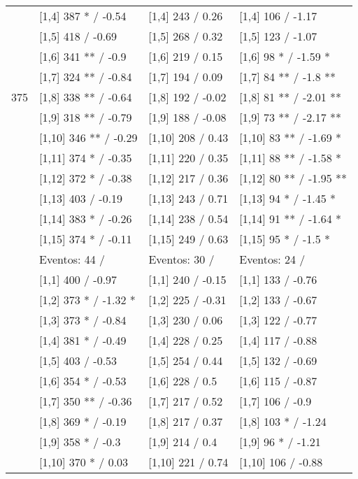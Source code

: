 \begin{table}
\begin{tabular}[t]{llll}
\addlinespace
 & {}[1,4] 387 * / -0.54 & {}[1,4] 243  / 0.26 & {}[1,4] 106  / -1.17\\
 & {}[1,5] 418  / -0.69 & {}[1,5] 268  / 0.32 & {}[1,5] 123  / -1.07\\
 & {}[1,6] 341 ** / -0.9 & {}[1,6] 219  / 0.15 & {}[1,6] 98 * / -1.59 *\\
 & {}[1,7] 324 ** / -0.84 & {}[1,7] 194  / 0.09 & {}[1,7] 84 ** / -1.8 **\\
375 & {}[1,8] 338 ** / -0.64 & {}[1,8] 192  / -0.02 & {}[1,8] 81 ** / -2.01 **\\
\addlinespace
 & {}[1,9] 318 ** / -0.79 & {}[1,9] 188  / -0.08 & {}[1,9] 73 ** / -2.17 **\\
 & {}[1,10] 346 ** / -0.29 & {}[1,10] 208  / 0.43 & {}[1,10] 83 ** / -1.69 *\\
 & {}[1,11] 374 * / -0.35 & {}[1,11] 220  / 0.35 & {}[1,11] 88 ** / -1.58 *\\
 & {}[1,12] 372 * / -0.38 & {}[1,12] 217  / 0.36 & {}[1,12] 80 ** / -1.95 **\\
 & {}[1,13] 403  / -0.19 & {}[1,13] 243  / 0.71 & {}[1,13] 94 * / -1.45 *\\
\addlinespace
 & {}[1,14] 383 * / -0.26 & {}[1,14] 238  / 0.54 & {}[1,14] 91 ** / -1.64 *\\
 & {}[1,15] 374 * / -0.11 & {}[1,15] 249  / 0.63 & {}[1,15] 95 * / -1.5 *\\
 & Eventos:  44 / & Eventos:  30 / & Eventos:  24 /\\
 & {}[1,1] 400  / -0.97 & {}[1,1] 240  / -0.15 & {}[1,1] 133  / -0.76\\
 & {}[1,2] 373 * / -1.32 * & {}[1,2] 225  / -0.31 & {}[1,2] 133  / -0.67\\
\addlinespace
 & {}[1,3] 373 * / -0.84 & {}[1,3] 230  / 0.06 & {}[1,3] 122  / -0.77\\
 & {}[1,4] 381 * / -0.49 & {}[1,4] 228  / 0.25 & {}[1,4] 117  / -0.88\\
 & {}[1,5] 403  / -0.53 & {}[1,5] 254  / 0.44 & {}[1,5] 132  / -0.69\\
 & {}[1,6] 354 * / -0.53 & {}[1,6] 228  / 0.5 & {}[1,6] 115  / -0.87\\
 & {}[1,7] 350 ** / -0.36 & {}[1,7] 217  / 0.52 & {}[1,7] 106  / -0.9\\
\addlinespace
500 & {}[1,8] 369 * / -0.19 & {}[1,8] 217  / 0.37 & {}[1,8] 103 * / -1.24\\
 & {}[1,9] 358 * / -0.3 & {}[1,9] 214  / 0.4 & {}[1,9] 96 * / -1.21\\
 & {}[1,10] 370 * / 0.03 & {}[1,10] 221  / 0.74 & {}[1,10] 106  / -0.88\\

\end{tabular}
\end{table}
